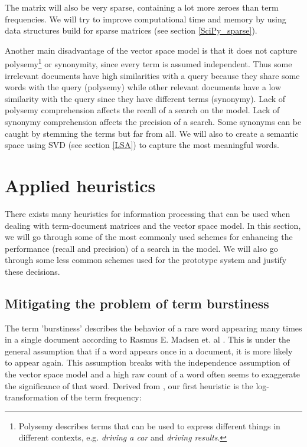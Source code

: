 The matrix will also be very sparse, containing a lot more zeroes than
term frequencies. We will try to improve computational time and memory
by using data structures build for sparse matrices (see section
\ref{SciPy_sparse}). 

Another main disadvantage of the vector space model is that it does
not capture polysemy\footnote{Polysemy describes terms that can be
  used to express different things in different contexts,
  e.g. \textit{driving a car} and \textit{driving results}.} or
synonymity, since every term is assumed independent. Thus some
irrelevant documents have high similarities with a query because they
share some words with the query (polysemy) while other relevant
documents have a low similarity with the query since they have
different terms (synonymy).  Lack of polysemy comprehension affects
the recall of a search on the model. Lack of synonymy comprehension
affects the precision of a search. Some synonyms can be caught by
stemming the terms but far from all. We will also to create a
semantic space using SVD (see section \ref{LSA}) to capture the most
meaningful words.

\section{Applied heuristics}

There exists many heuristics for information processing that can be
used when dealing with term-document matrices and the vector space
model. In this section, we will go through some of the most commonly
used schemes for enhancing the performance (recall and precision) of a
search in the model. We will also go through some less common schemes
used for the prototype system and justify these decisions.

\subsection{Mitigating the problem of term burstiness\label{MitigatingBurstiness}}

The term 'burstiness' describes the behavior of a rare word appearing
many times in a single document according to Rasmus E. Madsen et. al
\cite{ModelingWordBurstiness2005}. This is under the general
assumption that if a word appears once in a document, it is more
likely to appear again. This assumption breaks with the independence
assumption of the vector space model and a high raw count of a word
often seems to exaggerate the significance of that word. Derived from
\cite{ModelingWordBurstiness2005}, our first heuristic is the
log-transformation of the term frequency:

